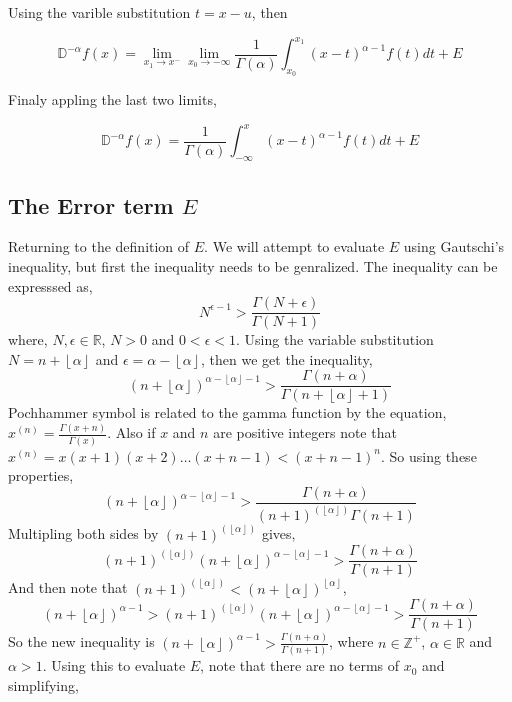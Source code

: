 \documentclass[%
 preprint,
 amsmath, amssymb, aps, pra, 10pt
]{revtex4-2}
\begin{document}
Using the varible substitution $t = x - u$, then

\[\mathbb{D}^{-\alpha}f(x) = \lim_{x_1 \to x^-} \lim_{x_0 \to -\infty} \frac{1}{\Gamma(\alpha)} \int_{x_0}^{x_1} (x - t)^{\alpha - 1} f(t)dt +  E\]

Finaly appling the last two limits,

\[\mathbb{D}^{-\alpha}f(x) = \frac{1}{\Gamma(\alpha)} \int_{-\infty}^x (x - t)^{\alpha - 1} f(t)dt +  E\]

\subsection{The Error term $E$}
Returning to the definition of $E$. We will attempt to evaluate $E$ using Gautschi's inequality, but first the inequality needs to be genralized. The inequality can be expresssed as, 
\[N^{\epsilon - 1} > \frac{\Gamma(N + \epsilon)}{\Gamma(N + 1)}\]
where, $N, \epsilon \in \mathbb{R}$, $N > 0$ and $0 < \epsilon < 1$. Using the variable substitution $N=n + \left\lfloor \alpha \right\rfloor$ and $\epsilon = \alpha - \left\lfloor \alpha \right\rfloor$, then we get the inequality,
\[(n + \left\lfloor \alpha \right\rfloor)^{\alpha - \left\lfloor \alpha \right\rfloor - 1} > \frac{\Gamma(n + \alpha)}{\Gamma(n + \left\lfloor \alpha \right\rfloor + 1)} \]
Pochhammer symbol is related to the gamma function by the equation, $x^{(n)} = \frac{\Gamma(x + n)}{\Gamma(x)}$. Also if $x$ and $n$ are positive integers note that $x^{(n)} = x(x+1)(x+2)\ldots(x+n-1) < (x+n-1)^n$. So using these properties,
\[(n + \left\lfloor \alpha \right\rfloor)^{\alpha - \left\lfloor \alpha \right\rfloor - 1} > \frac{\Gamma(n + \alpha)}{(n + 1)^{(\left\lfloor \alpha \right\rfloor)}\Gamma(n + 1)} \]
Multipling both sides by $(n + 1)^{(\left\lfloor \alpha \right\rfloor)}$ gives,
\[(n + 1)^{(\left\lfloor \alpha \right\rfloor)}(n + \left\lfloor \alpha \right\rfloor)^{\alpha - \left\lfloor \alpha \right\rfloor - 1} > \frac{\Gamma(n + \alpha)}{\Gamma(n + 1)} \]
And then note that $(n + 1)^{(\left\lfloor \alpha \right\rfloor)} < (n+\left\lfloor \alpha \right\rfloor)^{\left\lfloor \alpha \right\rfloor}$,
\[(n + \left\lfloor \alpha \right\rfloor)^{\alpha - 1} > (n + 1)^{(\left\lfloor \alpha \right\rfloor)}(n + \left\lfloor \alpha \right\rfloor)^{\alpha - \left\lfloor \alpha \right\rfloor - 1} > \frac{\Gamma(n + \alpha)}{\Gamma(n + 1)} \]
So the new inequality is $(n + \left\lfloor \alpha \right\rfloor)^{\alpha - 1} > \frac{\Gamma(n + \alpha)}{\Gamma(n + 1)}$, where $n \in \mathbb{Z}^+$, $\alpha \in \mathbb{R}$ and $\alpha > 1$. Using this to evaluate $E$, note that there are no terms of $x_0$ and simplifying,
\end{document}
